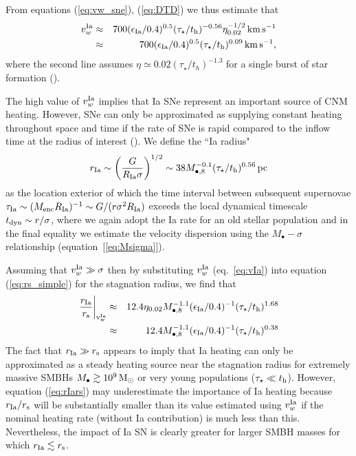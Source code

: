 \documentclass[usenatbib,fleqn]{mn2e}
\begin{document}
From equations (\ref{eq:vw_sne}), (\ref{eq:DTD}) we thus estimate that 
  \begin{eqnarray} 
    v_{w}^{\rm Ia} &\approx& 700(\epsilon_{\rm
      Ia}/0.4)^{0.5}(\tau_{\star}/t_{\rm h})^{-0.56}\eta_{0.02}^{-1/2}\,{\rm km
      \,s^{-1}} \nonumber \\
&\approx& 700(\epsilon_{\rm
      Ia}/0.4)^{0.5}(\tau_{\star}/t_{\rm h})^{0.09}\,{\rm km
      \,s^{-1}},
\label{eq:vIa}
  \end{eqnarray}
where the second line assumes $\eta\simeq 0.02 (\tau_{\star}/t_h)^{-1.3}$ for a single burst of star formation (\citealt{Ciotti+91}).

The high value of $v_{w}^{\rm Ia}$ implies that Ia SNe represent an important source of CNM heating.  However, SNe can only be approximated as supplying constant heating throughout space and time if the rate of SNe is rapid compared to the inflow time at the radius of interest (\citealt{ShcherbakovWong+:2014a}).  We define the ``Ia radius"
  \begin{align}
    r_{\rm Ia} \sim \left(\frac{G}{R_{\rm Ia}\sigma}\right)^{1/2} \sim
    38 M_{\bullet,8}^{-0.1}(\tau_{\star}/t_{\rm h})^{0.56}\,{\rm pc}
    \label{eq:rIa}
  \end{align}
as the location exterior of which the time interval between subsequent supernovae $\tau_{\rm Ia} \sim (M_{\rm enc}R_{\rm Ia})^{-1} \sim G/(r\sigma^{2}R_{\rm Ia})$ exceeds the local dynamical timescale $t_{\rm
dyn} \sim r/\sigma$, where we again adopt the Ia rate for an old stellar population and in the final equality we estimate the velocity dispersion using the $M_{\bullet}-\sigma$ relationship
(equation~[\ref{eq:Msigma}]).  

Assuming that $v_{w}^{\rm Ia} \gg \sigma$ then by substituting $v_{w}^{\rm Ia}$ (eq.~\ref{eq:vIa}) into equation (\ref{eq:rs_simple}) for the stagnation radius, we find that
\begin{eqnarray}
\left.\frac{r_{\rm Ia}}{r_{\rm s}}\right|_{\rm v_{w}^{\rm Ia}} &\approx& 12.4\eta_{0.02} M_{\bullet,8}^{-1.1}(\epsilon_{\rm Ia}/0.4)^{-1}(\tau_{\star}/t_{\rm h})^{1.68} \nonumber \\
&\approx& 12.4M_{\bullet,8}^{-1.1}(\epsilon_{\rm Ia}/0.4)^{-1}(\tau_{\star}/t_{\rm h})^{0.38}
\label{eq:rIars}
\end{eqnarray}
The fact that $r_{\rm Ia} \gg r_{\rm s}$ appears to imply that Ia heating can only be approximated as a steady heating source near the stagnation radius for extremely massive SMBHs $M_{\bullet} \gtrsim 10^9 \,{\rm M_\odot}$ or very young populations ($\tau_{\star} \ll t_{\rm h}$).  However, equation (\ref{eq:rIars}) may underestimate the importance of Ia heating because $r_{\rm Ia}/r_{\rm s}$ will be substantially smaller than its value estimated using $v_{w}^{\rm Ia}$ if the nominal heating rate (without Ia contribution) is much less than this.  Nevertheless, the impact of Ia SN is clearly greater for larger SMBH masses for which $r_{\rm Ia} \lesssim r_{\rm s}$.
\end{document}
